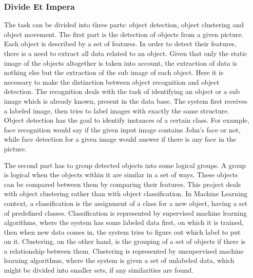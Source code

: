     \subsubsection{Divide Et Impera}
        The task can be divided into three parts: object detection, object clustering and object movement.
        The first part is the detection of objects from a given picture. Each object is described by a set of features. In order to detect their features, there is a need to extract all data related to  an object. Given that only the static image of the objects altogether is taken into account, the extraction of data is nothing else but the extraction of the sub image of each object. Here it is necessary to make the distinction between object recognition and object detection. The recognition deals with the task of identifying an object or a sub image which is already known, present in the data base. The system first receives a labeled image, then tries to label images with exactly the same structure. Object detection has the goal to identify instances of a certain class. For example, face recognition would say if the given input image contains John's face or not, while face detection for a given image would answer if there is any face in the picture. 

        The second part has to group detected objects into some logical groups. A group is logical when the objects within it are similar in a set of ways. These objects can be compared between them by comparing their features. This project deals with object clustering rather than with object classification. In Machine Learning context, a classification is the assignment of a class for a new object, having a set of predefined classes. Classification is represented by supervised machine learning algorithms, where the system has some labeled data first, on which it is trained, then when new data comes in, the system tries to figure out which label to put on it. Clustering, on the other hand, is the grouping of a set of objects if there is a relationship between them. Clustering is represented by unsupervised machine learning algorithms, where the system is given a set of unlabeled data, which might be divided into smaller sets, if any similarities are found. 

